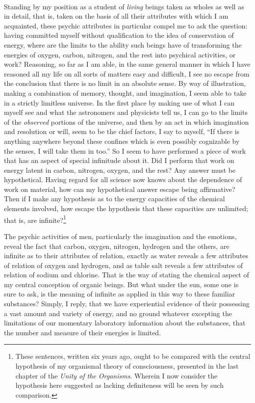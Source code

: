 \documentclass[a4paper, 11pt, oneside, polutonikogreek, english, landscape]{article}
\begin{document}
\paragraph{}
Standing by my position as a student of \emph{living} beings taken as wholes as well as in detail, that is, taken on the basis of all their attributes with which I am acquainted, these psychic attributes in particular compel me to ask the question: having committed myself without qualification to the idea of conservation of energy, where are the limits to the ability such beings have of transforming the energies of oxygen, carbon, nitrogen, and the rest into psychical activities, or work? Reasoning, so far as I am able, in the same general manner in which I have reasoned all my life on all sorts of matters easy and difficult, I see no escape from the conclusion that there is no limit in an absolute sense. By way of illustration, making a combination of memory, thought, and imagination, I seem able to take in a strictly limitless universe. In the first place by making use of what I can myself see and what the astronomers and physicists tell us, I can go to the limits of the \emph{observed} portions of the universe, and then by an act in which imagination and resolution or will, seem to be the chief factors, I say to myself, ``If there is anything anywhere beyond these confines which is even possibly cognizable by the senses, I will take them in too.'' So I seem to have performed a piece of work that has an aspect of special infinitude about it. Did I perform that work on energy latent in carbon, nitrogen, oxygen, and the rest? Any answer must be hypothetical. Having regard for all science now knows about the dependence of work on material, how can my hypothetical answer escape being affirmative? Then if I make any hypothesis as to the energy capacities of the chemical elements involved, how escape the hypothesis that these capacities are unlimited; that is, are infinite?\footnote{These sentences, written six years ago, ought to be compared with the central hypothesis of my organismal theory of consciousness, presented in the last chapter of the \emph{Unity of the Organisms}. Wherein I now consider the hypothesis here suggested as lacking definiteness will be seen by such comparison.}

The psychic activities of men, particularly the imagination and the emotions, reveal the fact that carbon, oxygen, nitrogen, hydrogen and the others, are infinite as to their attributes of relation, exactly as water reveals a few attributes of relation of oxygen and hydrogen, and as table salt reveals a few attributes of relation of sodium and chlorine. That is the way of stating the chemical aspect of my central conception of organic beings. But what under the sun, some one is sure to ask, is the meaning of infinite as applied in this way to these familiar substances? Simply, I reply, that we have experiential evidence of their possessing a vast amount and variety of energy, and no ground whatever excepting the limitations of our momentary laboratory information about the substances, that the number and measure of their energies is limited.
\end{document}
